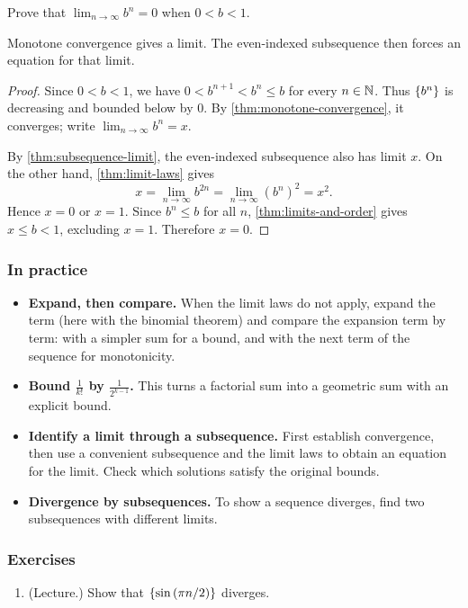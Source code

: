 \begin{example}\label{ex:geometric-zero}
    Prove that $\lim_{n\to\infty}b^n=0$ when $0<b<1$.
\end{example}
\begin{idea}
    Monotone convergence gives a limit. The even-indexed subsequence
    then forces an equation for that limit.
\end{idea}
\begin{proof}
    Since $0<b<1$, we have $0<b^{n+1}<b^n\leq b$ for every $n\in\mathbb{N}$.
    Thus $\left\{b^n\right\}$ is decreasing and bounded below by $0$.
    By \cref{thm:monotone-convergence}, it converges; write
    $\lim_{n\to\infty}b^n=x$.

    By \cref{thm:subsequence-limit}, the even-indexed subsequence also
    has limit $x$. On the other hand, \cref{thm:limit-laws} gives
    \[
        x=\lim_{n\to\infty}b^{2n}
         =\lim_{n\to\infty}(b^n)^2=x^2.
    \]
    Hence $x=0$ or $x=1$. Since $b^n\leq b$ for all $n$,
    \cref{thm:limits-and-order} gives $x\leq b<1$, excluding $x=1$.
    Therefore $x=0$.
\end{proof}

\subsubsection*{In practice}
\begin{itemize}
    \item \textbf{Expand, then compare.} When the limit laws do not apply, expand the term (here with the binomial theorem) and compare the expansion term by term: with a simpler sum for a bound, and with the next term of the sequence for monotonicity.
    \item \textbf{Bound $\frac1{k!}$ by $\frac1{2^{k-1}}$.} This turns a factorial sum into a geometric sum with an explicit bound.
    \item \textbf{Identify a limit through a subsequence.} First establish convergence, then use a convenient subsequence and the limit laws to obtain an equation for the limit. Check which solutions satisfy the original bounds.
    \item \textbf{Divergence by subsequences.} To show a sequence diverges, find two subsequences with different limits.
\end{itemize}

\subsubsection*{Exercises}
\begin{enumerate}
    \item (Lecture.) Show that $\left\{\sin\left(\pi n/2\right)\right\}$ diverges.
\end{enumerate}
